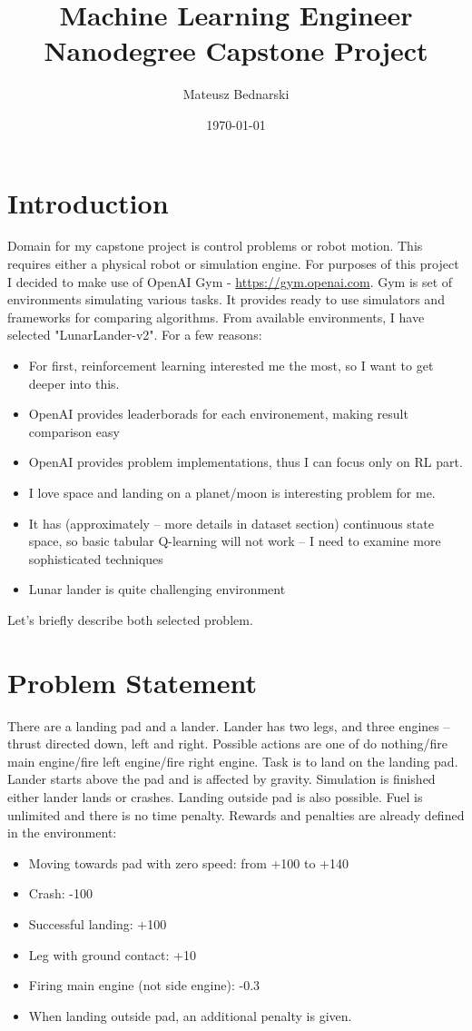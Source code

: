 \documentclass[12pt]{article}
\title{Machine Learning Engineer Nanodegree Capstone Project}
\author{Mateusz Bednarski}
\date{\today}
\begin{document}
\maketitle



\section{Introduction}

Domain for my capstone project is control problems or robot motion. This requires either a physical robot or simulation engine. For purposes of this project I decided to make use of OpenAI Gym - \url{https://gym.openai.com}. Gym is set of environments simulating various tasks. It provides ready to use simulators and frameworks for comparing algorithms. From available environments, I have selected "LunarLander-v2". For a few reasons:
\begin{itemize}
\item For first, reinforcement learning interested me the most, so I want to get deeper into this.
\item OpenAI provides leaderborads for each environement, making result comparison easy
\item OpenAI provides problem implementations, thus I can focus only on RL part.
\item I love space and landing on a planet/moon is interesting problem for me.
\item It has (approximately – more details in dataset section) continuous state space, so basic tabular Q-learning will not work – I need to examine more sophisticated techniques
\item Lunar lander is quite challenging environment
\end{itemize}


Let's briefly describe both selected problem.

\section{Problem Statement}

There are a landing pad and a lander. Lander has two legs, and three engines – thrust directed down, left and right. Possible actions are one of do nothing/fire main engine/fire left engine/fire right engine.  Task is to land on the landing pad.  Lander starts above the pad and is affected by gravity. Simulation is finished either lander lands or crashes. Landing outside pad is also possible. Fuel is unlimited and there is no time penalty.
Rewards and penalties are already defined in the environment:
\begin{itemize}
\item Moving towards pad with zero speed: from +100 to +140
\item Crash: -100
\item Successful landing: +100
\item Leg with ground contact: +10
\item Firing main engine (not side engine): -0.3
\item When landing outside pad, an additional penalty is given.
\end{itemize}
\end{document}
